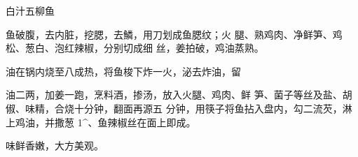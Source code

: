 \begin{recipe}{白汁五柳鱼}

\ingredients


\cooking

\step 	鱼破腹，去内脏，挖腮，去鱗，用刀划成鱼腮纹；火 腿、熟鸡肉、净鲜笋、鸡松、葱白、泡红辣椒，分别切成细 丝，姜拍破，鸡油蒸熟。

\step 	油在锅内烧至八成热，将鱼梭下炸一火，泌去炸油，留

油二两，加姜一跑，烹料酒，掺汤，放入火腿、鸡肉、鲜 笋、菌子等丝及盐、胡俶、味精，合烧十分钟，翻面再源五 分钟，用筷子将鱼拈入盘内，勾二流芡，淋上鸡油，并撒葱 1^、鱼辣椒丝在面上即成。

\notes

味鲜香嫩，大方美观。

\end{recipe}


